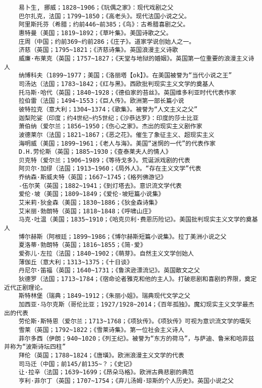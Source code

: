 \documentclass[UTF8]{../RepresentationUniverse}
\begin{document}
\begin{lstlisting}
    易卜生, 挪威；1828~1906；《玩偶之家》：现代戏剧之父
    巴尔扎克，法国；1799~1850；《高老头》。现代法国小说之父。
    阿里斯托芬（希腊；约前446~前385；《鸟》：古希腊喜剧之父。
    惠特曼（美国；1819~1892；《草叶集》。美国诗歌之父。
    庄周（中国；约前369~约前286；《庄子》。道家学说创始人之一。
    济慈（英国；1795~1821；《济慈诗集》。英国浪漫主义诗歌
    威廉·布莱克（英国；1757~1827；《天堂与地狱的婚姻》。英国第一位重要的浪漫主义诗人
    纳博科夫（1899~1977；美国；《洛丽塔【ok】》。在美国被誉为“当代小说之王”
    司汤达（法国；1783~1842；《红与黑》。西欧批判现实主义文学的奠基人
    托马斯·哈代（英国；1840~1928；《德伯家的苔丝》。英国维多利亚时代代表作家
    拉伯雷（法国；1494~1553；《巨人传》。欧洲第一部长篇小说
    彼特拉克（意大利；1304~1374；《歌集》。被誉为“人文主义之父”
    迦梨陀娑（印度；约4世纪~约5世纪；《沙恭达罗》：印度的莎士比亚
    萧伯纳（爱尔兰；1856~1950；《伤心之家》。杰出的现实主义剧作家
    波德莱尔（法国；1821~1867；《恶之花》。催生了象征主义、超现实主义
    海明威（美国；1899~1961；《老人与海》。美国“迷惘的一代”的代表作家
    D.H.劳伦斯（英国；1885~1930；《查泰莱夫人的情人》
    贝克特（爱尔兰；1906~1989；《等待戈多》。荒诞派戏剧的代表
    阿贝尔·加缪（法国；1913~1960；《局外人》。“存在主义文学”代表
    乔纳森·斯威夫特（英国；1667~1745；《格列佛游记》
    -伍尔芙（英国；1882~1941；《到灯塔去》。意识流文学代表
    爱伦·坡（美国；1809~1849；《爱伦·坡短篇小说集》
    艾米莉·狄金森（美国；1830~1886；《狄金森诗集》
    艾米丽·勃朗特（英国；1818~1848；《呼啸山庄》
    马克·吐温（美国；1835~1910；《哈克贝利·费恩历险记》。美国批判现实主义文学的奠基人
    博尔赫斯（阿根廷；1899~1986；《博尔赫斯短篇小说集》。拉丁美洲小说之父
    夏洛蒂·勃朗特（英国；1816~1855；《简·爱》
    爱弥儿·左拉（法国；1840~1902；《萌芽》。自然主义文学创始人
    薄伽丘（意大利；1313~1375；《十日谈》
    丹尼尔·笛福（英国；1640~1731；《鲁滨逊漂流记》。英国散文之父
    狄德罗（法国；1713~1784；《宿命论者雅克和他的主人》。打破悲剧和喜剧的界限，奠定近代正剧理论。
    斯特林堡（瑞典；1849~1912；《朱丽小姐》。瑞典现代文学之父
    加西亚·马尔克斯（哥伦比亚；1927/1928~2014；《百年孤独》。魔幻现实主义文学最杰出的代表
    劳伦斯·斯特恩（爱尔兰；1713~1768；《项狄传》。《项狄传》可视为意识流文学的嚆矢
    雪莱（英国；1792~1822；《雪莱诗集》。第一位社会主义诗人
    菲尔多西（伊朗；940~1020；《列王纪》。被誉为“东方的荷马”，与萨迪、鲁米和哈菲兹并称为“波斯诗坛四柱”
    拜伦（英国；1788~1824；《唐璜》。欧洲浪漫主义文学的代表
    司马迁（中国；前145/前135~？；《史记》
    让·拉辛（法国；1639~1699；《昂朵马格》。欧洲古典悲剧的典范
    亨利·菲尔丁（英国；1707~1754；《弃儿汤姆·琼斯的个人历史》。英国小说之父

\end{lstlisting}
\end{document}
